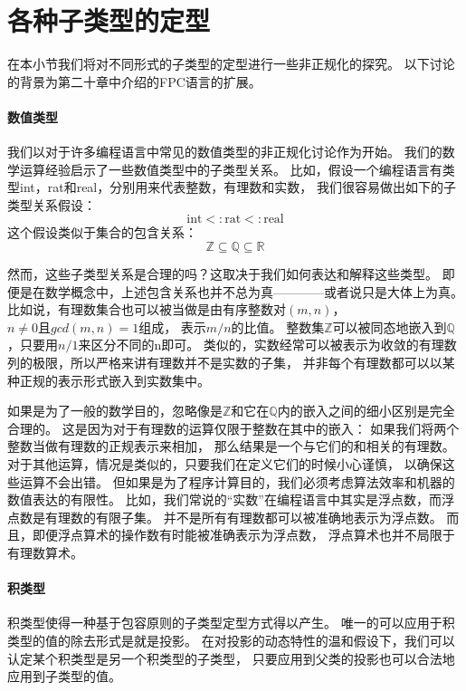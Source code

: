 \section{各种子类型的定型}\label{section:structural_subtyping_Varieties_of_Subtyping}
在本小节我们将对不同形式的子类型的定型进行一些非正规化的探究。
以下讨论的背景为第二十章中介绍的FPC语言的扩展。
\paragraph{数值类型}
我们以对于许多编程语言中常见的数值类型的非正规化讨论作为开始。
我们的数学运算经验启示了一些数值类型中的子类型关系。
比如，假设一个编程语言有类型int，rat和real，分别用来代表整数，有理数和实数，
我们很容易做出如下的子类型关系假设：
$$\mathrm{int<:rat<:real}$$
这个假设类似于集合的包含关系：
$$\mathbb{Z\subseteq Q\subseteq R}$$

然而，这些子类型关系是合理的吗？这取决于我们如何表达和解释这些类型。
即便是在数学概念中，上述包含关系也并不总为真————或者说只是大体上为真。
比如说，有理数集合也可以被当做是由有序整数对$(m,n)$，$n\neq0\texttt{且}gcd(m,n)=1$组成，
表示$m/n$的比值。
整数集$\mathbb{Z}$可以被同态地嵌入到$\mathbb{Q}$，只要用$n/1$来区分不同的n即可。
类似的，实数经常可以被表示为收敛的有理数列的极限，所以严格来讲有理数并不是实数的子集，
并非每个有理数都可以以某种正规的表示形式嵌入到实数集中。

如果是为了一般的数学目的，忽略像是$\mathbb{Z}$和它在$\mathbb{Q}$内的嵌入之间的细小区别是完全合理的。
这是因为对于有理数的运算仅限于整数在其中的嵌入：
如果我们将两个整数当做有理数的正规表示来相加，
那么结果是一个与它们的和相关的有理数。
对于其他运算，情况是类似的，只要我们在定义它们的时候小心谨慎，
以确保这些运算不会出错。
但如果是为了程序计算目的，我们必须考虑算法效率和机器的数值表达的有限性。
比如，我们常说的“实数”在编程语言中其实是浮点数，而浮点数是有理数的有限子集。
并不是所有有理数都可以被准确地表示为浮点数。
而且，即便浮点算术的操作数有时能被准确表示为浮点数，
浮点算术也并不局限于有理数算术。

\paragraph{积类型}
积类型使得一种基于包容原则的子类型定型方式得以产生。
唯一的可以应用于积类型的值的除去形式是就是投影。
在对投影的动态特性的温和假设下，我们可以认定某个积类型是另一个积类型的子类型，
只要应用到父类的投影也可以合法地应用到子类型的值。


